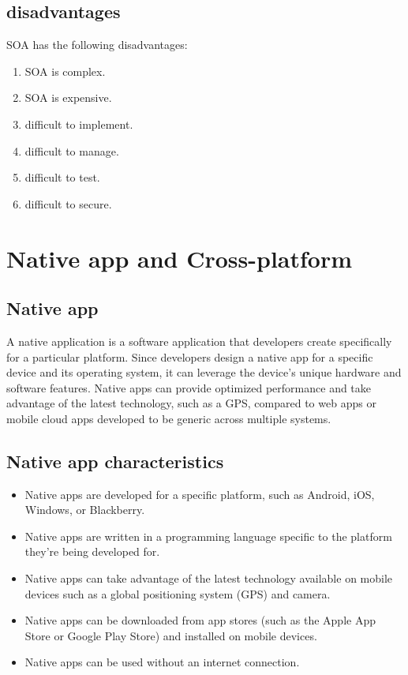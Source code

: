 \documentclass[12pt,a4paper, twosite]{article}
\begin{document}
\subsection{disadvantages}
\label{sec:orgb8b6b9a}
SOA has the following disadvantages:
\begin{enumerate}

\item SOA is complex.
\item SOA is expensive.
\item difficult to implement.
\item difficult to manage.
\item difficult to test.
\item difficult to secure.
\end{enumerate}

\section{Native app and Cross-platform}
\label{sec:orgb8b6b9b}

\subsection{Native app}
\label{sec:orgb8b6b9c}
A native application is a software application that developers create specifically for a particular platform. Since developers design a native app for a specific device and its operating system, it can leverage the device's unique hardware and software features. Native apps can provide optimized performance and take advantage of the latest technology, such as a GPS, compared to web apps or mobile cloud apps developed to be generic across multiple systems.

\subsection*{Native app characteristics}
\label{sec:orgb8b6b2b}

\begin{itemize}
\item Native apps are developed for a specific platform, such as Android, iOS, Windows, or Blackberry.
\item Native apps are written in a programming language specific to the platform they're being developed for.
\item Native apps can take advantage of the latest technology available on mobile devices such as a global positioning system (GPS) and camera.
\item Native apps can be downloaded from app stores (such as the Apple App Store or Google Play Store) and installed on mobile devices.
\item Native apps can be used without an internet connection.
\end{itemize}
\end{document}
